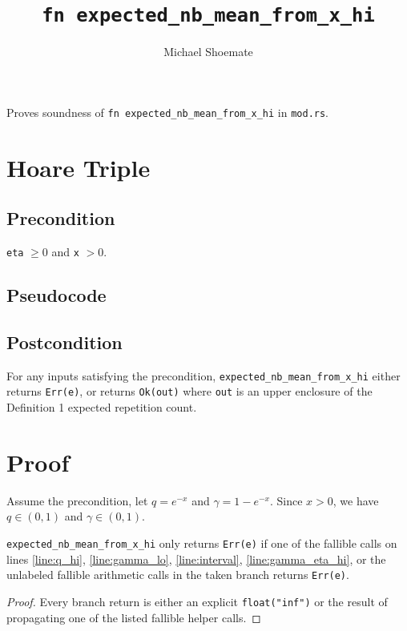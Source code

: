 \documentclass{article}
\title{\texttt{fn expected\_nb\_mean\_from\_x\_hi}}
\author{Michael Shoemate}
\begin{document}
\maketitle

Proves soundness of \texttt{fn expected\_nb\_mean\_from\_x\_hi} in \texttt{mod.rs}.

\section{Hoare Triple}
\subsection*{Precondition}
\texttt{eta} $\ge 0$ and \texttt{x} $> 0$.

\subsection*{Pseudocode}


\subsection*{Postcondition}
\begin{theorem}
\label{postcondition}
For any inputs satisfying the precondition,
\texttt{expected\_nb\_mean\_from\_x\_hi} either returns \texttt{Err(e)},
or returns \texttt{Ok(out)} where \texttt{out} is an upper enclosure of the Definition 1
expected repetition count.
\end{theorem}

\section{Proof}
Assume the precondition, let $q = e^{-x}$ and $\gamma = 1 - e^{-x}$.
Since $x > 0$, we have $q \in (0,1)$ and $\gamma \in (0,1)$.

\begin{lemma}
\label{err-e}
\texttt{expected\_nb\_mean\_from\_x\_hi} only returns \texttt{Err(e)} if one of the fallible calls
on lines \ref{line:q_hi}, \ref{line:gamma_lo}, \ref{line:interval}, \ref{line:gamma_eta_hi},
or the unlabeled fallible arithmetic calls in the taken branch returns \texttt{Err(e)}.
\end{lemma}

\begin{proof}
Every branch return is either an explicit \texttt{float("inf")} or the result of propagating one
of the listed fallible helper calls.
\end{proof}
\end{document}
